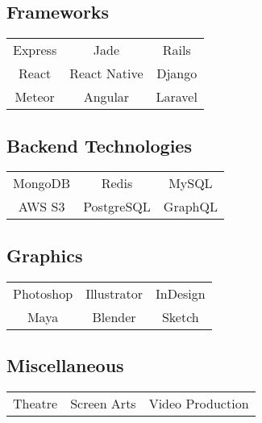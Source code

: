 \documentclass[letterpaper]{deedy-resume} %
\begin{document}
\begin{minipage}[t]{0.33\textwidth}
  \vspace{4mm}

  \subsection{Frameworks}

  \begin{tabular}{ c c c }
    Express & Jade & Rails \\
    React & React Native & Django \\
    Meteor & Angular & Laravel
  \end{tabular}

  \vspace{4mm}

  \subsection{Backend Technologies}

  \begin{tabular}{ c c c }
    MongoDB & Redis & MySQL \\
    AWS S3 & PostgreSQL & GraphQL
  \end{tabular}

  \vspace{4mm}

  \subsection{Graphics}

  \begin{tabular}{ c c c }
    Photoshop & Illustrator & InDesign \\
    Maya & Blender & Sketch
  \end{tabular}


  \vspace{4mm}

  \subsection{Miscellaneous}

  \begin{tabular}{ c c c }
    Theatre & Screen Arts & Video Production
  \end{tabular}

  
  \sectionspace %



\end{minipage} %
\end{document}
